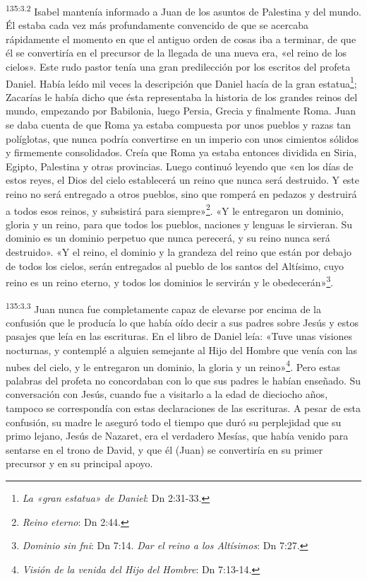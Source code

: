 \par
\textsuperscript{135:3.2} Isabel mantenía informado a Juan de los asuntos de Palestina y del mundo. Él estaba cada vez más profundamente convencido de que se acercaba rápidamente el momento en que el antiguo orden de cosas iba a terminar, de que él se convertiría en el precursor de la llegada de una nueva era, «el reino de los cielos». Este rudo pastor tenía una gran predilección por los escritos del profeta Daniel. Había leído mil veces la descripción que Daniel hacía de la gran estatua\footnote{\textit{La «gran estatua» de Daniel}: Dn 2:31-33.}; Zacarías le había dicho que ésta representaba la historia de los grandes reinos del mundo, empezando por Babilonia, luego Persia, Grecia y finalmente Roma. Juan se daba cuenta de que Roma ya estaba compuesta por unos pueblos y razas tan políglotas, que nunca podría convertirse en un imperio con unos cimientos sólidos y firmemente consolidados. Creía que Roma ya estaba entonces dividida en Siria, Egipto, Palestina y otras provincias. Luego continuó leyendo que «en los días de estos reyes, el Dios del cielo establecerá un reino que nunca será destruido. Y este reino no será entregado a otros pueblos, sino que romperá en pedazos y destruirá a todos esos reinos, y subsistirá para siempre»\footnote{\textit{Reino eterno}: Dn 2:44.}. «Y le entregaron un dominio, gloria y un reino, para que todos los pueblos, naciones y lenguas le sirvieran. Su dominio es un dominio perpetuo que nunca perecerá, y su reino nunca será destruido». «Y el reino, el dominio y la grandeza del reino que están por debajo de todos los cielos, serán entregados al pueblo de los santos del Altísimo, cuyo reino es un reino eterno, y todos los dominios le servirán y le obedecerán»\footnote{\textit{Dominio sin fni}: Dn 7:14. \textit{Dar el reino a los Altísimos}: Dn 7:27.}.

\par
\textsuperscript{135:3.3} Juan nunca fue completamente capaz de elevarse por encima de la confusión que le producía lo que había oído decir a sus padres sobre Jesús y estos pasajes que leía en las escrituras. En el libro de Daniel leía: «Tuve unas visiones nocturnas, y contemplé a alguien semejante al Hijo del Hombre que venía con las nubes del cielo, y le entregaron un dominio, la gloria y un reino»\footnote{\textit{Visión de la venida del Hijo del Hombre}: Dn 7:13-14.}. Pero estas palabras del profeta no concordaban con lo que sus padres le habían enseñado. Su conversación con Jesús, cuando fue a visitarlo a la edad de dieciocho años, tampoco se correspondía con estas declaraciones de las escrituras. A pesar de esta confusión, su madre le aseguró todo el tiempo que duró su perplejidad que su primo lejano, Jesús de Nazaret, era el verdadero Mesías, que había venido para sentarse en el trono de David, y que él (Juan) se convertiría en su primer precursor y en su principal apoyo.

